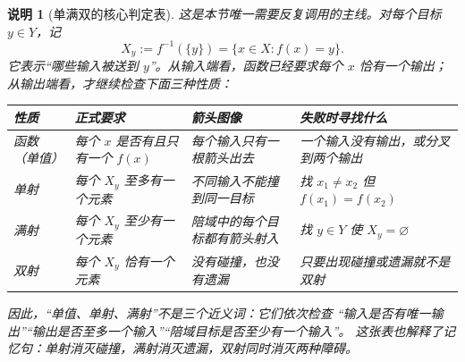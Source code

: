 \documentclass[UTF8,fontset=none,a4paper,11pt]{ctexart}
\theoremstyle{foundation-definition}
\theoremstyle{foundation-theorem}
\theoremstyle{foundation-proposition}
\theoremstyle{foundation-example}
\theoremstyle{foundation-remark}
\newtheorem{remark}[definition]{说明}
\theoremstyle{foundation-theorem}
\begin{document}
\begin{remark}[单满双的核心判定表]\label{rem:map-core-table}
这是本节唯一需要反复调用的主线。对每个目标 \(y\in Y\)，记
\[
  X_y:=f^{-1}(\{y\})=\{x\in X:f(x)=y\}.
\]
它表示“哪些输入被送到 \(y\)”。从输入端看，函数已经要求每个 \(x\) 恰有一个输出；从输出端看，才继续检查下面三种性质：
\begin{center}
\small
\begin{tabularx}{\textwidth}{p{}p{}p{}X}
\toprule
性质 & 正式要求 & 箭头图像 & 失败时寻找什么 \\
\midrule
函数（单值）
& 每个 \(x\) 是否有且只有一个 \(f(x)\)
& 每个输入只有一根箭头出去
& 一个输入没有输出，或分叉到两个输出 \\
单射
& 每个 \(X_y\) 至多有一个元素
& 不同输入不能撞到同一目标
& 找 \(x_1\ne x_2\) 但 \(f(x_1)=f(x_2)\) \\
满射
& 每个 \(X_y\) 至少有一个元素
& 陪域中的每个目标都有箭头射入
& 找 \(y\in Y\) 使 \(X_y=\varnothing\) \\
双射
& 每个 \(X_y\) 恰有一个元素
& 没有碰撞，也没有遗漏
& 只要出现碰撞或遗漏就不是双射 \\
\bottomrule
\end{tabularx}
\end{center}
因此，“单值、单射、满射”不是三个近义词：它们依次检查
“输入是否有唯一输出”“输出是否至多一个输入”“陪域目标是否至少有一个输入”。
这张表也解释了记忆句：单射消灭碰撞，满射消灭遗漏，双射同时消灭两种障碍。
\end{remark}
\end{document}
